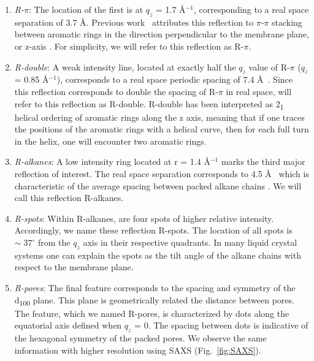 \documentclass[journal=jpcbfk,manusciprt=article]{achemso}
\begin{document}
  \begin{enumerate} 
  
	\item \textit{R-$\pi$}: The location of the first is at $q_z$ = 1.7
	\AA$^{-1}$, corresponding to a real space separation of 3.7 {\AA}. Previous
	work~\cite{feng_scalable_2014} attributes this reflection to $\pi$-$\pi$
	stacking between aromatic rings in the direction perpendicular to the membrane
	plane, or z-axis \cite{feng_scalable_2014}. For simplicity, we will refer to
	this reflection as R-$\pi$.
 
	\item \textit{R-double}: A weak intensity line, located at exactly half
	the $q_z$ value of R-$\pi$ ($q_z$ = 0.85 \AA$^{-1}$), corresponds to a real
	space periodic spacing of 7.4 \AA~. Since this reflection corresponds to double
	the spacing of R-$\pi$ in real space, will refer to this reflection as R-double. 
	R-double has been interpreted as 2\textsubscript{1} helical ordering of aromatic
	rings along the z axis\cite{feng_scalable_2014}, meaning that if one traces the 
	positions of the aromatic rings with a helical curve, then for each full turn 
	in the helix, one will encounter two aromatic rings.

	\item \textit{R-alkanes}: A low intensity ring located at r = 1.4
	\AA$^{-1}$ marks the third major reflection of interest. The real space
	separation corresponds to 4.5 \AA~ which is characteristic of the average
	spacing between packed alkane chains \cite{mcintosh_organization_1980}. We will
	call this reflection R-alkanes.

	\item \textit{R-spots}: Within R-alkanes, are four spots of higher
	relative intensity.  Accordingly, we name these reflection R-spots. The
	location of all spots is $\sim\;37^{\circ}$ from the $q_z$ axis in their
	respective quadrants. In many liquid crystal systems one can explain the spots
	as the tilt angle of the alkane chains with respect to the membrane
	plane\cite{govind_simple_2001}.
 
	\item \textit{R-pores}: The final feature corresponds to the spacing
	and symmetry of the d\textsubscript{100} plane. This plane is geometrically
	related the distance between pores. The feature, which we named R-pores, is
	characterized by dots along the equatorial axis defined when $q_z$ = 0. The
	spacing between dots is indicative of the hexagonal symmetry of the packed
	pores. We observe the same information with higher resolution using SAXS
	(Fig.~\ref{fig:SAXS}). 

  \end{enumerate}
\end{document}
